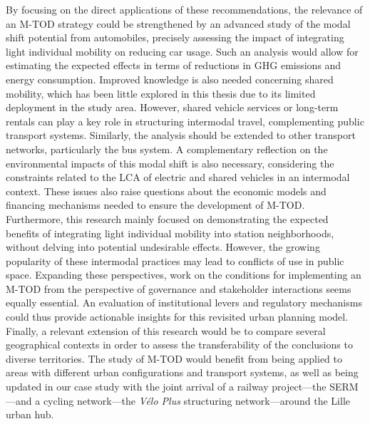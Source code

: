 \begin{refsegment}
By focusing on the direct applications of these recommendations, the relevance of an \acrshort{M-TOD} strategy could be strengthened by an advanced study of the modal shift potential from automobiles, precisely assessing the impact of integrating light individual mobility on reducing car usage. Such an analysis would allow for estimating the expected effects in terms of reductions in \acrfull{GHG} emissions and energy consumption. Improved knowledge is also needed concerning shared mobility, which has been little explored in this thesis due to its limited deployment in the study area. However, shared vehicle services or long-term rentals can play a key role in structuring intermodal travel, complementing public transport systems. Similarly, the analysis should be extended to other transport networks, particularly the bus system. A complementary reflection on the environmental impacts of this modal shift is also necessary, considering the constraints related to the \acrfull{LCA} of electric and shared vehicles in an intermodal context. These issues also raise questions about the economic models and financing mechanisms needed to ensure the development of \acrshort{M-TOD}. Furthermore, this research mainly focused on demonstrating the expected benefits of integrating light individual mobility into station neighborhoods, without delving into potential undesirable effects. However, the growing popularity of these intermodal practices may lead to conflicts of use in public space. Expanding these perspectives, work on the conditions for implementing an \acrshort{M-TOD} from the perspective of governance and stakeholder interactions seems equally essential. An evaluation of institutional levers and regulatory mechanisms could thus provide actionable insights for this revisited urban planning model. Finally, a relevant extension of this research would be to compare several geographical contexts in order to assess the transferability of the conclusions to diverse territories. The study of \acrshort{M-TOD} would benefit from being applied to areas with different urban configurations and transport systems, as well as being updated in our case study with the joint arrival of a railway project—the \acrfull{SERM}—and a cycling network—the \textsl{Vélo Plus} structuring network—around the Lille urban hub.%

    \newpage
    \begingroup
    \renewcommand{\bibfont}{\scriptsize}
\printbibliography[segment=\therefsegment, heading=subbibintoc, title={Bibliography of Conclusion}, label=conclusion:bibliographie]
    \endgroup
    \end{refsegment}
